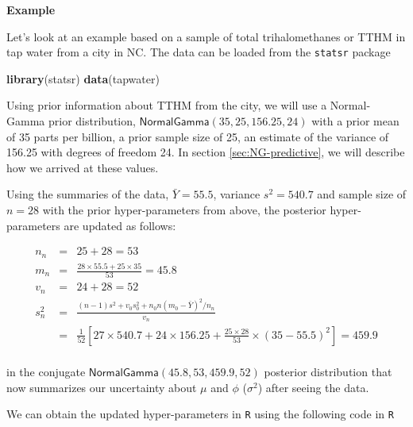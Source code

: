 \documentclass[]{book}
\newenvironment{Shaded}{\begin{snugshade}}{\end{snugshade}}
\newcommand{\KeywordTok}[1]{\textcolor[rgb]{0.13,0.29,0.53}{\textbf{#1}}}
\newcommand{\NormalTok}[1]{#1}
\theoremstyle{definition}
\theoremstyle{definition}
\theoremstyle{definition}
\theoremstyle{remark}
\begin{document}
\textbf{Example}

Let's look at an example based on a sample of total trihalomethanes or
TTHM in tap water from a city in NC. The data can be loaded from the
\texttt{statsr} package

\begin{Shaded}
\begin{Highlighting}[]
\KeywordTok{library}\NormalTok{(statsr)}
\KeywordTok{data}\NormalTok{(tapwater)}
\end{Highlighting}
\end{Shaded}

Using prior information about TTHM from the city, we will use a
Normal-Gamma prior distribution,
\(\textsf{NormalGamma}(35, 25, 156.25, 24)\) with a prior mean of 35
parts per billion, a prior sample size of 25, an estimate of the
variance of 156.25 with degrees of freedom 24. In section
\ref{sec:NG-predictive}, we will describe how we arrived at these
values.

Using the summaries of the data, \(\bar{Y} = 55.5\), variance
\(s^2 = 540.7\) and sample size of \(n = 28\) with the prior
hyper-parameters from above, the posterior hyper-parameters are updated
as follows:

\begin{eqnarray*}
n_n & = &  25 +  28 = 53\\
m_n  & = & \frac{28 \times55.5 + 25 \times35}{53} = 45.8  \\
v_n & = & 24 + 28 = 52  \\
s^2_n & = & \frac{(n-1) s^2 + v_0 s^2_0 + n_0 n (m_0 - \bar{Y})^2 /n_n }{v_n}  \\
  & = & \frac{1}{52}
     \left[27 \times 540.7 +
          24 \times 156.25  +
          \frac{25 \times 28}{53} \times (35 - 55.5)^2
\right] = 459.9  \\
\end{eqnarray*}

in the conjugate \(\textsf{NormalGamma}(45.8, 53, 459.9, 52)\) posterior
distribution that now summarizes our uncertainty about \(\mu\) and
\(\phi\) (\(\sigma^2\)) after seeing the data.

We can obtain the updated hyper-parameters in \texttt{R} using the
following code in \texttt{R}
\end{document}

